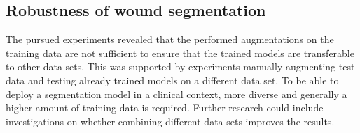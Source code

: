\subsection{Robustness of wound segmentation}

The pursued experiments revealed that the performed augmentations on the training data are not sufficient to ensure that the trained models are transferable to other data sets. This was supported by experiments manually augmenting test data and testing already trained models on a different data set. To be able to deploy a segmentation model in a clinical context, more diverse and generally a higher amount of training data is required. Further research could include investigations on whether combining different data sets improves the results.